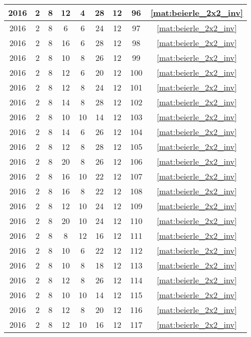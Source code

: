 \begin{longtable}{|c|c|c|c|c|c|c|c|c|}
2016 & 2 & 8 & 12 & 4 & 28 & 12 & 96 & \eqref{mat:beierle_2x2_inv} \\ \hline 
2016 & 2 & 8 & 6 & 6 & 24 & 12 & 97 & \eqref{mat:beierle_2x2_inv} \\ \hline 
2016 & 2 & 8 & 16 & 6 & 28 & 12 & 98 & \eqref{mat:beierle_2x2_inv} \\ \hline 
2016 & 2 & 8 & 10 & 8 & 26 & 12 & 99 & \eqref{mat:beierle_2x2_inv} \\ \hline 
2016 & 2 & 8 & 12 & 6 & 20 & 12 & 100 & \eqref{mat:beierle_2x2_inv} \\ \hline 
2016 & 2 & 8 & 12 & 8 & 24 & 12 & 101 & \eqref{mat:beierle_2x2_inv} \\ \hline 
2016 & 2 & 8 & 14 & 8 & 28 & 12 & 102 & \eqref{mat:beierle_2x2_inv} \\ \hline 
2016 & 2 & 8 & 10 & 10 & 14 & 12 & 103 & \eqref{mat:beierle_2x2_inv} \\ \hline 
2016 & 2 & 8 & 14 & 6 & 26 & 12 & 104 & \eqref{mat:beierle_2x2_inv} \\ \hline 
2016 & 2 & 8 & 12 & 8 & 28 & 12 & 105 & \eqref{mat:beierle_2x2_inv} \\ \hline 
2016 & 2 & 8 & 20 & 8 & 26 & 12 & 106 & \eqref{mat:beierle_2x2_inv} \\ \hline 
2016 & 2 & 8 & 16 & 10 & 22 & 12 & 107 & \eqref{mat:beierle_2x2_inv} \\ \hline 
2016 & 2 & 8 & 16 & 8 & 22 & 12 & 108 & \eqref{mat:beierle_2x2_inv} \\ \hline 
2016 & 2 & 8 & 12 & 10 & 24 & 12 & 109 & \eqref{mat:beierle_2x2_inv} \\ \hline 
2016 & 2 & 8 & 20 & 10 & 24 & 12 & 110 & \eqref{mat:beierle_2x2_inv} \\ \hline 
2016 & 2 & 8 & 8 & 12 & 16 & 12 & 111 & \eqref{mat:beierle_2x2_inv} \\ \hline 
2016 & 2 & 8 & 10 & 6 & 22 & 12 & 112 & \eqref{mat:beierle_2x2_inv} \\ \hline 
2016 & 2 & 8 & 10 & 8 & 18 & 12 & 113 & \eqref{mat:beierle_2x2_inv} \\ \hline 
2016 & 2 & 8 & 12 & 8 & 26 & 12 & 114 & \eqref{mat:beierle_2x2_inv} \\ \hline 
2016 & 2 & 8 & 10 & 10 & 14 & 12 & 115 & \eqref{mat:beierle_2x2_inv} \\ \hline 
2016 & 2 & 8 & 12 & 8 & 20 & 12 & 116 & \eqref{mat:beierle_2x2_inv} \\ \hline 
2016 & 2 & 8 & 12 & 10 & 16 & 12 & 117 & \eqref{mat:beierle_2x2_inv} \\ \hline 

\end{longtable}
